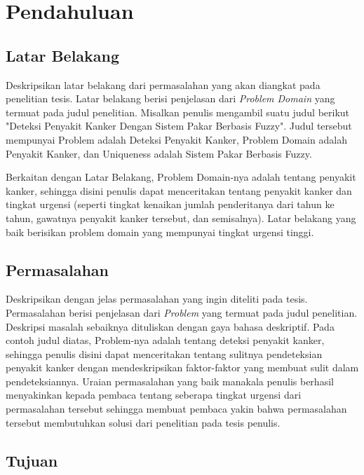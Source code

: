 \chapter{Pendahuluan}
\label{bab:pendahuluan}

\section{Latar Belakang}

Deskripsikan latar belakang dari permasalahan yang akan diangkat pada
penelitian tesis. Latar belakang berisi penjelasan dari \textit{Problem Domain}
yang termuat pada judul penelitian. Misalkan penulis mengambil suatu judul
berikut "Deteksi Penyakit Kanker Dengan Sistem Pakar Berbasis Fuzzy". Judul
tersebut mempunyai Problem adalah Deteksi Penyakit Kanker, Problem Domain adalah
Penyakit Kanker, dan Uniqueness adalah Sistem Pakar Berbasis Fuzzy.

Berkaitan dengan Latar Belakang, Problem Domain-nya adalah tentang penyakit
kanker, sehingga disini penulis dapat menceritakan tentang penyakit kanker dan
tingkat urgensi (seperti tingkat kenaikan jumlah penderitanya dari tahun ke
tahun, gawatnya penyakit kanker tersebut, dan semisalnya). Latar belakang yang
baik berisikan problem domain yang mempunyai tingkat urgensi tinggi.

\section{Permasalahan}

Deskripsikan dengan jelas permasalahan yang ingin diteliti pada tesis.
Permasalahan berisi penjelasan dari \textit{Problem} yang termuat pada judul
penelitian. Deskripsi masalah sebaiknya dituliskan dengan gaya bahasa
deskriptif. Pada contoh judul diatas, Problem-nya adalah tentang deteksi
penyakit kanker, sehingga penulis disini dapat menceritakan tentang sulitnya
pendeteksian penyakit kanker dengan mendeskripsikan faktor-faktor yang membuat
sulit dalam pendeteksiannya. Uraian permasalahan yang baik manakala penulis
berhasil menyakinkan kepada pembaca tentang seberapa tingkat urgensi dari
permasalahan tersebut sehingga membuat pembaca yakin bahwa permasalahan
tersebut membutuhkan solusi dari penelitian pada tesis penulis.

\section{Tujuan}

